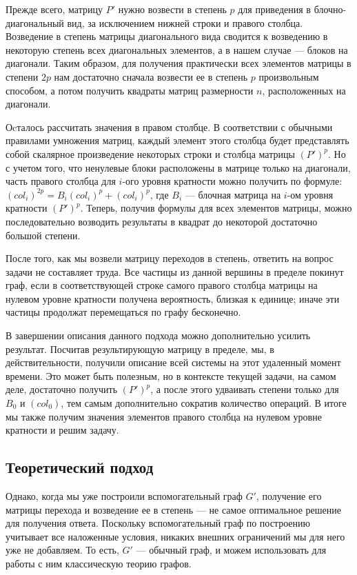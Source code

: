 Прежде всего, матрицу $P'$ нужно возвести в степень $p$ для приведения в блочно-диагональный вид, за исключением нижней строки и правого столбца. Возведение в степень матрицы диагонального вида сводится к возведению в некоторую степень всех диагональных элементов, а в нашем случае --- блоков на диагонали. Таким образом, для получения практически всех элементов матрицы в степени $2p$ нам достаточно сначала возвести ее в степень $p$ произвольным способом, а потом получить квадраты матриц размерности $n$, расположенных на диагонали. 

Оcталось рассчитать значения в правом столбце. В соответствии с обычными правилами умножения матриц, каждый элемент этого столбца будет представлять собой скалярное произведение некоторых строки и столбца матрицы $(P')^p$. Но с учетом того, что ненулевые блоки расположены в матрице только на диагонали, часть правого столбца для $i$-ого уровня кратности можно получить по формуле: $(col_i)^{2p} = B_i(col_i)^{p} + (col_i)^{p}$, где $B_i$ --- блочная матрица на $i$-ом уровня кратности $(P')^p$. Теперь, получив формулы для всех элементов матрицы, можно последовательно возводить результаты в квадрат до некоторой достаточно большой степени.

После того, как мы возвели матрицу переходов в степень, ответить на вопрос задачи не составляет труда. Все частицы из данной вершины в пределе покинут граф, если в соответствующей строке самого правого столбца матрицы на нулевом уровне кратности получена вероятность, близкая к единице; иначе эти частицы продолжат перемещаться по графу бесконечно. 

В завершении описания данного подхода можно дополнительно усилить результат. Посчитав результирующую матрицу в пределе, мы, в действительности, получили описание всей системы на этот удаленный момент времени. Это может быть полезным, но в контексте текущей задачи, на самом деле, достаточно получить $(P')^p$, а после этого удваивать степени только для $B_0$ и $(col_0)$, тем самым дополнительно сократив количество операций. В итоге мы также получим значения элементов правого столбца на нулевом уровне кратности и решим задачу. 

\subsection{Теоретический подход}

Однако, когда мы уже построили вспомогательный граф $G'$, получение его матрицы перехода и возведение ее в степень --- не самое оптимальное решение для получения ответа. Поскольку вспомогательный граф по построению учитывает все наложенные условия, никаких внешних ограничений мы для него уже не добавляем. То есть, $G'$ --- обычный граф, и можем использовать для работы с ним классическую теорию графов. 

